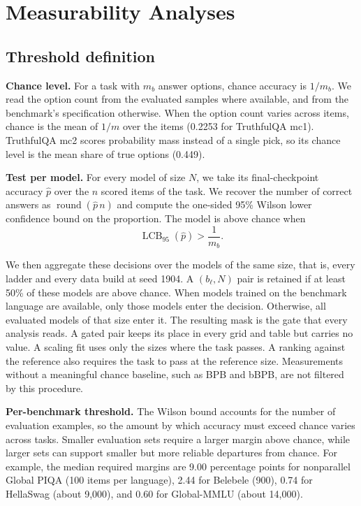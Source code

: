 \clearpage
\section{Measurability Analyses}
\label{app:rq1_measurability}
\label{app:rq00_chance_threshold}
\label{app:chance-threshold}

\subsection{Threshold definition}
\label{app:chance-threshold-definition}

\textbf{Chance level.} For a task with $m_b$ answer options, chance accuracy is $1/m_b$. We read the option count from the evaluated samples where available, and from the benchmark's specification otherwise. When the option count varies across items, chance is the mean of $1/m$ over the items (0.2253 for TruthfulQA mc1). TruthfulQA mc2 scores probability mass instead of a single pick, so its chance level is the mean share of true options (0.449).

\textbf{Test per model.} For every model of size $N$, we take its final-checkpoint accuracy $\hat{p}$ over the $n$ scored items of the task. We recover the number of correct answers as $\operatorname{round}(\hat{p}\,n)$ and compute the one-sided 95\% Wilson lower confidence bound on the proportion. The model is above chance when
\[
\operatorname{LCB}_{95}(\hat{p}) > \frac{1}{m_b}.
\]

We then aggregate these decisions over the models of the same size, that is, every ladder and every data build at seed 1904.
A $(b_\ell, N)$ pair is retained if at least 50\% of these models are above chance.
When models trained on the benchmark language are available, only those models enter the decision. Otherwise, all evaluated models of that size enter it.
The resulting mask is the gate that every analysis reads. A gated pair keeps its place in every grid and table but carries no value. A scaling fit uses only the sizes where the task passes. A ranking against the reference also requires the task to pass at the reference size.
Measurements without a meaningful chance baseline, such as BPB and bBPB, are not filtered by this procedure.

\textbf{Per-benchmark threshold.} The Wilson bound accounts for the number of evaluation examples, so the amount by which accuracy must exceed chance varies across tasks.
Smaller evaluation sets require a larger margin above chance, while larger sets can support smaller but more reliable departures from chance.
For example, the median required margins are 9.00 percentage points for nonparallel Global PIQA (100 items per language), 2.44 for Belebele (900), 0.74 for HellaSwag (about 9,000), and 0.60 for Global-MMLU (about 14,000).


